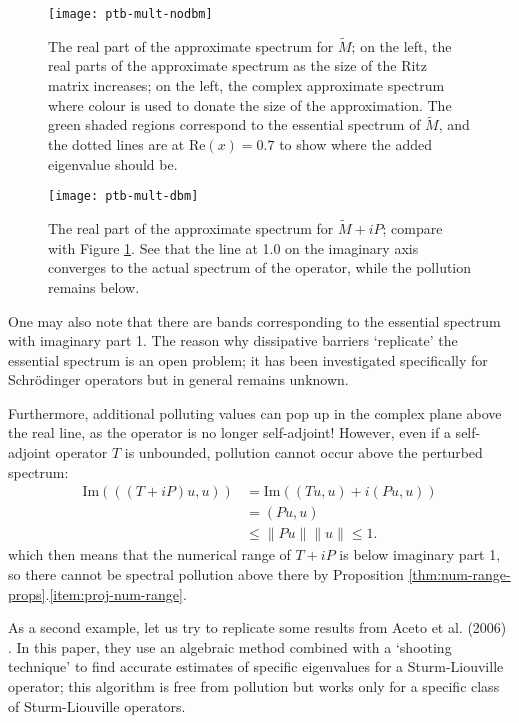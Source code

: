 \documentclass[../main.tex]{subfiles}
\begin{document}
\begin{figure}[h!]
\centering
\texttt{[image: ptb-mult-nodbm]}
\caption{The real part of the approximate spectrum for $\tilde{M}$; on the
	left, the real parts of the approximate
	spectrum as the size of the Ritz matrix increases; on the left, the
	complex approximate spectrum where colour is used to donate the size of
	the approximation. The green shaded regions correspond to the essential
	spectrum of $\tilde{M}$, and the dotted lines are at $\mathrm{Re}(x) =
  0.7$ to show where the added eigenvalue should be.} 
\label{fig:nodbm}
\end{figure}

\begin{figure}[h!] 
\centering
\texttt{[image: ptb-mult-dbm]}
\caption{The real part of the approximate spectrum for $\tilde{M}+iP$; compare
	with Figure \ref{fig:nodbm}. See that the line at 1.0 on the imaginary
	axis converges to the actual spectrum of the operator, while the
	pollution remains below.}
\label{fig:dbm}
\end{figure}
\clearpage

\begin{remark}
One may also note that there are bands corresponding to the
essential spectrum with imaginary part 1. The reason why dissipative
barriers `replicate' the essential spectrum is an open problem; it has
been investigated specifically for Schr\"odinger operators
\cite{stepanenko2022spectral} but in general remains unknown.

Furthermore, additional polluting values can pop up in the complex plane
above the real line, as the operator is no longer self-adjoint! However,
even if a self-adjoint operator $T$ is unbounded, pollution cannot
occur above the perturbed spectrum:
  \begin{align*}
    \mathrm{Im}(((T + iP) u, u)) & = \mathrm{Im}((Tu, u) + i(Pu, u)) \\
                       & = (Pu, u)  \\
                       & \leq \|Pu\|\|u\| \leq 1.
  \end{align*}
which then means that the numerical range of $T + iP$ is below imaginary part 1,
  so there cannot be spectral pollution above there by Proposition 
  \ref{thm:num-range-props}.\ref{item:proj-num-range}.
\end{remark}

As a second example, let us try to replicate some results from Aceto et al.
(2006) \cite{aceto2006numerical}. In this paper, they use an algebraic method
combined with a `shooting technique' to find accurate estimates of specific
eigenvalues for a Sturm-Liouville operator; this algorithm is free from
pollution but works only for a specific class of Sturm-Liouville operators.
\end{document}
